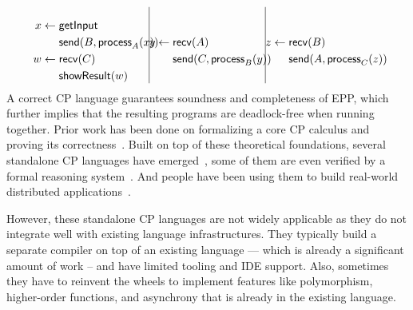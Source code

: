 \[
\begin{minipage}{.3\textwidth}
  \begin{equation*}
    \begin{split}
      x \leftarrow \; & \mathsf{getInput} \\
                      & \mathsf{send}(B, \mathsf{process}_A(x)) \\
      w \leftarrow \; & \mathsf{recv}(C) \\
                      & \mathsf{showResult}(w)
    \end{split}
  \end{equation*}
\end{minipage}
\hfill\vline\hfill
\begin{minipage}{.3\textwidth}
  \begin{equation*}
    \begin{split}
      y \leftarrow \; & \mathsf{recv}(A) \\
                      & \mathsf{send}(C, \mathsf{process}_B(y)) \\
    \end{split}
  \end{equation*}
\end{minipage}
\hfill\vline\hfill
\begin{minipage}{.3\textwidth}
  \begin{equation*}
    \begin{split}
      z \leftarrow \; & \mathsf{recv}(B) \\
                      & \mathsf{send}(A, \mathsf{process}_C(z)) \\
    \end{split}
  \end{equation*}
\end{minipage}
\]
%
A correct CP language guarantees soundness and completeness of EPP, which further implies that the resulting programs are deadlock-free when running together.
%
Prior work has been done on formalizing a core CP calculus and proving its correctness~\citep{cruzfilipe-2020, cruzfilipe-2022, hirsch-2022}.
%
Built on top of these theoretical foundations, several standalone CP languages have emerged~\citep{giallorenzo-2024}, some of them are even verified by a formal reasoning system~\citep{pohjola-2022, cruzfillipe-2023}.
%
And people have been using them to build real-world distributed applications~\citep{lugovic-2023}.

However, these standalone CP languages are not widely applicable as they do not integrate well with existing language infrastructures.
%
They typically build a separate compiler on top of an existing language --- which is already a significant amount of work -- and have limited tooling and IDE support.
%
Also, sometimes they have to reinvent the wheels to implement features like polymorphism, higher-order functions, and asynchrony that is already in the existing language.

